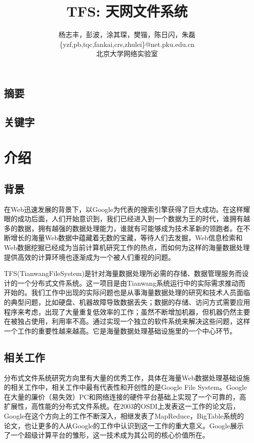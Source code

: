 \documentclass[11pt,a4paper]{scrartcl} %
\begin{document}
\begin{CJK*}{UTF8}{gbsn}
\title{TFS: 天网文件系统}
\author{{\rm 杨志丰，彭波，涂其琛，樊锴，陈日闪，朱磊}\\
\{yzf,pb,tqc,fankai,crs,zhulei\}@net.pku.edu.cn\\
北京大学网络实验室}
\date{}
\maketitle

\subsection*{摘要}
\subsection*{关键字}
\section{介绍}
\subsection{背景}
在Web迅速发展的背景下，以Google为代表的搜索引擎获得了巨大成功。在这样耀眼的成功后面，人们开始意识到，我们已经进入到一个数据为王的时代，谁拥有越多的数据，拥有越强的数据处理能力，谁就有可能够成为技术革新的领跑者。在不断增长的海量Web数据中蕴藏着无数的宝藏，等待人们去发掘，Web信息检索和Web数据挖掘已经成为当前计算机研究工作的热点，而如何为这样的海量数据处理提供高效的计算环境也逐渐成为一个被人们重视的问题。

TFS(TianwangFileSystem)是针对海量数据处理所必需的存储、数据管理服务而设计的一个分布式文件系统。这一项目是由Tianwang系统运行中的实际需求推动而开始的。我们工作中出现的实际问题也是从事海量数据处理的研究和技术人员面临的典型问题，比如硬盘、机器故障导致数据丢失；数据的存储、访问方式需要应用程序来考虑，出现了大量重复低效率的工作；虽然不断增加机器，但机器仍然主要在被独占使用，利用率不高。通过实现一个独立的软件系统来解决这些问题，这样一个工作的重要性越来越高。它是海量数据处理基础设施里的一个中心环节。

\subsection{相关工作}
分布式文件系统研究方向里有大量的优秀工作，具体在海量Web数据处理基础设施的相关工作中，相关工作中最有代表性和开创性的是Google File System\cite{gfs2003}。Google在大量的廉价（易失效）PC和网络连接的硬件平台基础上实现了一个可靠的，高扩展性，高性能的分布式文件系统。在2003的OSDI上发表这一工作的论文后，Google在这个方向上的工作不断深入，相继发表了MapReduce\cite{mapreduce}，BigTable系统\cite{bigtable}的论文，也让更多的人从Google的工作中认识到这一工作的重大意义。Google展示了一个超级计算平台的雏形，这一技术成为其公司的核心价值所在。


\end{CJK*}
\end{document}
